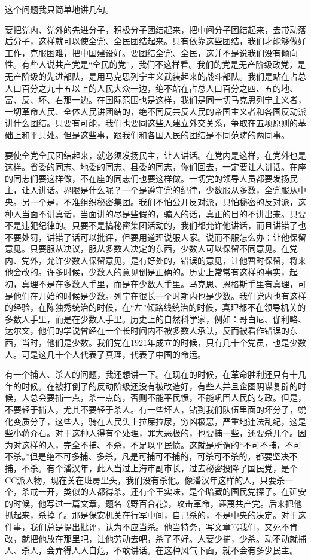 这个问题我只简单地讲几句。

要把党内、党外的先进分子，积极分子团结起来，把中间分子团结起来，去带动落后分子，这样就可以使全党、全民团结起来。只有依靠这些团结，我们才能够做好工作，克服困难，把中国建设好。要团结全党、全民，这并不是说我们没有倾向性。有些人说共产党是“全民的党”，我们不这样看。我们的党是无产阶级政党，是无产阶级的先进部队，是用马克思列宁主义武装起来的战斗部队。我们是站在占总人口百分之九十五以上的人民大众一边，绝不站在占总人口百分之四、五的地、富、反、坏、右那一边。在国际范围也是这样，我们是同一切马克思列宁主义者，一切革命人民、全体人民讲团结的，绝不同反共反人民的帝国主义者和各国反动派讲什么团结。只要有可能，我们也要同这些人建立外交关系，争取在五项原则的基础上和平共处。但是这些事，跟我们和各国人民的团结是不同范畴的两同事。

要使全党全民团结起来，就必须发扬民主，让人讲话。在党内是这样，在党外也是这样。省委的同志、地委的同志、县委的同志，你们回去，一定要让人讲话。在座的同志们要这样做，不在座的同志们也要这样做。一切党的领导人员都要发扬民主，让人讲话。界限是什么呢？一个是遵守党的纪律，少数服从多数，全党服从中央。另一个是，不准组织秘密集团。我们不怕公开反对派，只怕秘密的反对派，这种人当面不讲真话，当面讲的尽是些假的，骗人的话，真正的目的不讲出来。只要不是违犯纪律的。只要不是搞秘密集团活动的，我们都允许他讲话，而且讲错了也不要处罚，讲错了话可以批评，但要用道理说服人家。说而不服怎么办：让他保留意见。只要服从决议，服从多数人决定的东西，少数人可以保留不同意见。在党内、党外，允许少数人保留意见，是有好处的，错误的意见，让他暂时保留，将来他会改的。许多时候，少数人的意见倒是正确的。历史上常常有这样的事实，起初，真理不是在多数人手里，而是在少数人手里。马克思、恩格斯手里有真理，可是他们在开始的时候是少数。列宁在很长一个时期内也是少数。我们党内也有这样的经验，在陈独秀统治的时候，在“左”倾路线统治的时候，真理都不在领导机关的多数人手里，而是在少数人手里。历史上的自然科学家，例如：哥白尼、伽利略、达尔文，他们的学说曾经在一个长时间内不被多数人承认，反而被看作错误的东西，当时，他们是少数。我们党在1921年成立的时候，只有几十个党员，也是少数人。可是这几十个人代表了真理，代表了中国的命运。

有一个捕人、杀人的问题，我还想讲一下。在现在的时候，在革命胜利还只有十几年的时候。在被打倒了的反动阶级还没有被改造好，有些人并且企图阴谋复辟的时候，人总会要捕一点，杀一点的，否则不能平民愤，不能巩固人民的专政。但是，不要轻于捕人，尤其不要轻于杀人。有一些坏人，钻到我们队伍里面的坏分子，蜕化变质分子，这些人，骑在人民头上拉屎拉尿，穷凶极恶，严重地违法乱纪，这是些小蒋介石。对于这种人得有个处理，罪大恶极的，也要捕一些，还要杀几个。因为对这样的人，完全不捕、不杀，不足以平民愤。这就是所谓的“不可不捕，不可不杀。”但是绝不可多捕、多杀。凡是可捕可不捕的，可杀可不杀的，都要坚决不捕，不杀。有个潘汉年，此人当过上海市副市长，过去秘密投降了国民党，是个CC派人物，现在关在班房里头，我们没有杀他。像潘汉年这样的人，只要杀一个，杀戒一开，类似的人都得杀。还有个王实味，是个暗藏的国民党探子。在延安的时候，他写过一篇文章，题名《野百合花》，攻击革命，诬蔑共产党。后来把他抓起来，杀掉了。那是保安机关在行军中间，自己杀的，不是中央的决定。对于这件事，我们总是提出批评，认为不应当杀。他当特务，写文章骂我们，又死不肯改，就把他放在那里吧，让他劳动去吧，杀了不好。人要少捕，少杀。动不动就捕人、杀人，会弄得人人自危，不敢讲话。在这种风气下面，就不会有多少民主。


